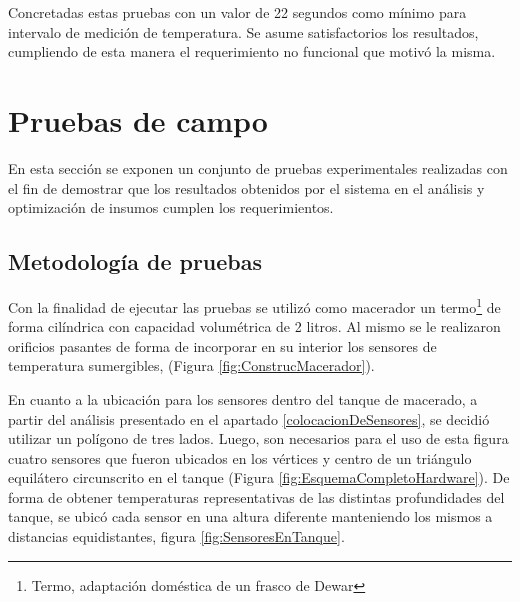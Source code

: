 \par
Concretadas estas pruebas con un valor de 22 segundos como mínimo para intervalo de medición de temperatura. Se asume satisfactorios los resultados, cumpliendo de esta manera el requerimiento no funcional que motivó la misma.


\section{Pruebas de campo}
\par En esta sección se exponen un conjunto de pruebas experimentales realizadas con el fin de demostrar que los resultados obtenidos por el sistema en el análisis y optimización de insumos cumplen los requerimientos. 

    \subsection{Metodología de pruebas}
        
        \par Con la finalidad de ejecutar las pruebas se utilizó como macerador un termo\footnote{Termo, adaptación doméstica de un frasco de Dewar} de forma cilíndrica con capacidad volumétrica de 2 litros. Al mismo se le realizaron orificios pasantes de forma de incorporar en su interior los sensores de temperatura sumergibles, (Figura \ref{fig:ConstrucMacerador}).
        
        \par En cuanto a la ubicación para los sensores dentro del tanque de macerado, a partir del análisis presentado en el apartado \ref{colocacionDeSensores}, se decidió utilizar un polígono de tres lados. Luego, son necesarios para el uso de esta figura cuatro sensores que fueron ubicados en los vértices y centro de un triángulo equilátero circunscrito en el tanque (Figura \ref{fig:EsquemaCompletoHardware}). De forma de obtener temperaturas representativas de las distintas profundidades del tanque, se ubicó cada sensor en una altura diferente manteniendo los mismos a distancias equidistantes, figura \ref{fig:SensoresEnTanque}.
   
